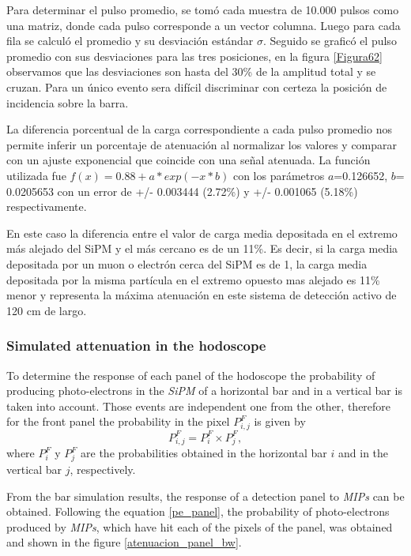 \documentclass[submitting]{nst}
\begin{document}
Para determinar el pulso promedio, se tomó cada muestra de 10.000 pulsos como una matriz, donde cada pulso corresponde a un vector columna. Luego para cada fila se calculó el promedio y su desviación estándar $\sigma$. Seguido se graficó el pulso promedio con sus desviaciones para las tres posiciones, en la figura \ref{Figura62} observamos que las desviaciones son hasta del 30\% de la amplitud total y se cruzan. Para un único evento sera difícil discriminar con certeza la posición de incidencia sobre la barra.

La diferencia porcentual de la carga correspondiente a cada pulso promedio nos permite inferir un porcentaje de atenuación al normalizar los valores y comparar con un ajuste exponencial que coincide con una señal atenuada. La función utilizada fue $f(x)=0.88+a*exp(-x*b)$ con los parámetros $a$=0.126652, $b$= 0.0205653 con un error de +/- 0.003444 (2.72\%) y +/- 0.001065 (5.18\%) respectivamente.

En este caso la diferencia entre el valor de carga media depositada en el extremo más alejado del SiPM y el más cercano es de un 11\%. Es decir, si la carga media depositada por un muon o electrón cerca del SiPM es de 1, la carga media depositada por la misma partícula en el extremo opuesto mas alejado es 11\% menor y representa la máxima atenuación en este sistema de detección activo de 120 cm de largo.



\subsubsection{Simulated attenuation in the hodoscope}
\label{sec:hodoscope-response-two} %
To determine the response of each panel of the hodoscope the probability of producing photo-electrons in the \textsl{SiPM} of a horizontal bar and in a vertical bar is taken into account. Those events are independent one from the other, therefore for the front panel the probability in the pixel $P^{F}_{i,j}$ is given by 
\begin{equation}
\label{pe_panel}
P^{F}_{i,j}=P^{F}_{i} \times P^{F}_{j},
\end{equation}
where $P^{F}_{i}$ y $P^{F}_j$ are the probabilities obtained in the horizontal bar $i$ and in the vertical bar $j$, respectively.

From the bar simulation results, the response of a detection panel to \textsl{MIPs} can be obtained. Following the equation \ref{pe_panel}, the probability of photo-electrons produced by \textsl{MIPs}, which have hit each of the pixels of the panel, was obtained and shown in the figure \ref{atenuacion_panel_bw}.
\end{document}

